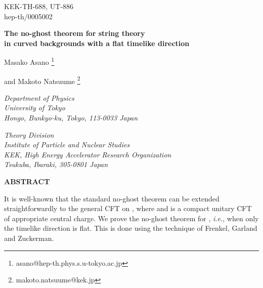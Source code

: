 \documentclass[a4paper,12pt]{article}
\makeatletter
\def\fnote#1#2{\begingroup\def\thefootnote{#1}\footnote{#2}
    \addtocounter{footnote}{-1}\endgroup}
\def\Email{makoto.natsuume@kek.jp}
\def\asano{asano@hep-th.phys.s.u-tokyo.ac.jp}
\def\IR{\relax{\rm I\kern-.18em R}}
\makeatother
\begin{document}
\pagestyle{empty}

\begin{flushright}
        KEK-TH-688, UT-886\\
        hep-th/0005002\\
\end{flushright}

\vspace{18pt}

\begin{center}
{\large \bf The no-ghost theorem for string theory} \\ \vspace{4pt}
{\large \bf in curved backgrounds with a flat timelike direction}

\vspace{16pt}
Masako Asano \coordHE{} \fnote{\dag}{\asano} and Makoto Natsuume \coordHE{}
\fnote{*}{\Email}

\vspace{16pt}

{\sl {}\coordHE{} Department of Physics\\
University of Tokyo\\
Hongo, Bunkyo-ku, Tokyo, 113-0033 Japan}

\vspace{8pt}

{\sl {}\coordHE{} Theory Division\\
Institute of Particle and Nuclear Studies\\
KEK, High Energy Accelerator Research Organization\\
Tsukuba, Ibaraki, 305-0801 Japan}

\vspace{12pt}
{\bf ABSTRACT}

\end{center}

\begin{minipage}{4.8in}
It is well-known that the standard no-ghost theorem can be extended 
straightforwardly to the general \coordHE{} CFT on \myHighlight{$ \IR^{d-1,1} \times K $}\coordHE{}, where \coordHE{} and \coordHE{} is a compact unitary CFT of appropriate central charge. We prove the no-ghost theorem for \coordHE{}, {\it i.e.}, when only the timelike direction is flat. This is done using the technique of Frenkel, Garland and Zuckerman.
\end{minipage}
\end{document}
